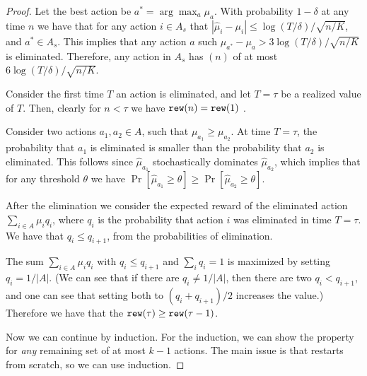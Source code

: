 \begin{proof}
Let the best action be $a^*=\arg\max_a \mu_a$. With probability
$1-\delta$ at any time $n$ we have that for any action $i\in A_s$
that $|\hat{\mu}_i -\mu_i|\leq \log(T/\delta)/\sqrt{n/K}$, and
$a^*\in A_s$. This implies that any action $a$ such
$\mu_{a^*}-\mu_{a}> 3\log(T/\delta)/\sqrt{n/K}$ is eliminated.
Therefore, any action in $A_s$ has \BIR$(n)$ of at most
$6\log(T/\delta)/\sqrt{n/K}$.

Consider the first time $T$ an action is eliminated, and let
$T=\tau$ be a realized value of $T$. Then, clearly for $n<\tau$ we
have $\mathtt{rew}(n)=\mathtt{rew}(1)$ .

Consider two actions $a_1,a_2\in A$, such that $\mu_{a_1} \geq
\mu_{a_2}$. At time $T=\tau$, the probability that  $a_1$ is
eliminated is smaller than the probability that $a_2$ is eliminated.
This follows since $\hat{\mu}_{a_1}$ stochastically dominates
$\hat{\mu}_{a_2}$, which implies that for any threshold $\theta$ we
have $\Pr[\hat{\mu}_{a_1}\geq\theta]\geq
\Pr[\hat{\mu}_{a_2}\geq\theta]$.

After the elimination we consider the expected reward of the
eliminated action $\sum_{i\in A} \mu_i q_i$, where $q_i$ is the
probability that action $i$ was eliminated in time $T=\tau$. We have
that $q_i \leq q_{i+1}$, from the probabilities of elimination.

The sum $\sum_{i\in A} \mu_i q_i$ with $q_i \leq q_{i+1}$ and
$\sum_i q_i=1$ is maximized by setting $q_i=1/|A|$. (We can see that
if there are $q_i\neq 1/|A|$, then there are two $q_{i}< q_{i+1}$,
and one can see that setting both to $(q_{i}+ q_{i+1})/2$ increases
the value.) Therefore we have that the $\mathtt{rew}(\tau)\geq\mathtt{rew}(\tau-1)$.

Now we can continue by induction. For the induction, we can show the
property for {\em any} remaining set of at most $k-1$ actions. The
main issue is that \SuccesiveEliminationReset restarts from scratch,
so we can use induction.
\end{proof}
